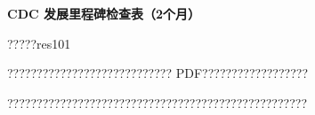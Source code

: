 \documentclass[11pt]{article}
\begin{document}
{\color[HTML]{0A84FF}\LARGE\bfseries CDC 发展里程碑检查表（2个月）\par}
{\color[HTML]{667085}\small ?????res101\par}
\vspace{1em}
???????????????????????????? PDF??????????????????

???????????????????????????????????????????????????
\end{document}
